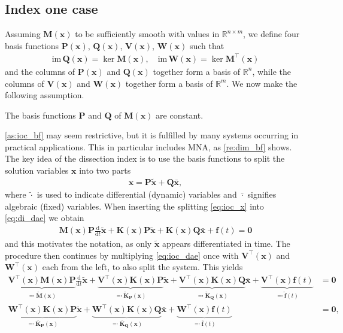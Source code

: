 \documentclass[AMA,STIX1COL]{WileyNJD-v2}
\newcommand{\mb}[1]{\mathbf{#1}}
\newcommand{\mbt}[1]{\tilde{\mathbf{#1}}}
\newcommand{\mbb}[1]{\bar{\mathbf{#1}}}
\newcommand{\mr}[1]{\mathrm{#1}}
\newcommand{\T}{{\!\top}}
\newcommand{\ddt}{\frac{\mathrm{d}}{\mathrm{d}t}}
\begin{document}
\subsection{Index one case}
\label{subsec:ioc}
Assuming $\mb{M}(\mb{x})$ to be sufficiently smooth with values in $\mathbb{R}^{n \times m}$, we define four basis functions $\mb{P}(\mb{x})$, $\mb{Q}(\mb{x})$, $\mb{V}(\mb{x})$, $\mb{W}(\mb{x})$ such that
\begin{align*}
    \mr{im\, } \mb{Q}(\mb{x}) = \ker \mb{M}(\mb{x}), \quad \mr{im\, } \mb{W}(\mb{x}) = \ker \mb{M}^\T (\mb{x})
\end{align*}
and the columns of $\mb{P}(\mb{x})$ and $\mb{Q}(\mb{x})$ together form a basis of $\mathbb{R}^n$, while the columns of $\mb{V}(\mb{x})$ and $\mb{W}(\mb{x})$ together form a basis of $\mathbb{R}^m$. We now make the following assumption.
\begin{assumption}
    \label{as:ioc_bf}
    The basis functions $\mb{P}$ and $\mb{Q}$ of $\mb{M}(\mb{x})$ are constant.
\end{assumption}
\autoref{as:ioc_bf} may seem restrictive, but it is fulfilled by many systems occurring in practical applications\cite{jansen2014}. This in particular includes MNA, as \autoref{re:dim_bf} shows. The key idea of the dissection index is to use the basis functions to split the solution variables $\mb{x}$ into two parts
\begin{align}
    \mb{x} = \mb{P} \mbt{x} + \mb{Q} \mbb{x}, \label{eq:ioc_x}
\end{align}
where $\tilde{\cdot}$ is used to indicate differential (dynamic) variables and $\bar{\cdot}$ signifies algebraic (fixed) variables. When inserting the splitting \eqref{eq:ioc_x} into \eqref{eq:di_dae} we obtain
\begin{align}
    \mb{M}(\mb{x}) \mb{P} \ddt \mbt{x} + \mb{K}(\mb{x}) \mb{P} \mbt{x} + \mb{K}(\mb{x}) \mb{Q} \mbb{x} + \mb{f}(t) = \mb{0} \label{eq:ioc_dae}
\end{align}
and this motivates the notation, as only $\mbt{x}$ appears differentiated in time. The procedure then continues by multiplying \eqref{eq:ioc_dae} once with $\mb{V}^\T (\mb{x})$ and $\mb{W}^\T (\mb{x})$ each from the left, to also split the system. This yields
\begin{subequations}
    \label{eq:ioc_io}
    \begin{align}
            \underbrace{\mb{V}^\T (\mb{x}) \mb{M}(\mb{x}) \mb{P}}_{\eqqcolon \mbt{M}(\mb{x})} \ddt \mbt{x} + \underbrace{\mb{V}^\T (\mb{x}) \mb{K}(\mb{x}) \mb{P}}_{\eqqcolon \mbt{K}_\mb{P}(\mb{x})} \mbt{x} + \underbrace{\mb{V}^\T (\mb{x}) \mb{K}(\mb{x}) \mb{Q}}_{\eqqcolon \mbt{K}_\mb{Q}(\mb{x})} \mbb{x} + \underbrace{\mb{V}^\T (\mb{x}) \mb{f}(t)}_{\eqqcolon \mbt{f}(t)} &= \mb{0} \label{eq:ioc_ioa}\\
            \underbrace{\mb{W}^\T (\mb{x}) \mb{K}(\mb{x}) \mb{P}}_{\eqqcolon \mbb{K}_\mb{P}(\mb{x})} \mbt{x} + \underbrace{\mb{W}^\T (\mb{x}) \mb{K}(\mb{x}) \mb{Q}}_{\eqqcolon \mbb{K}_\mb{Q}(\mb{x})} \mbb{x} + \underbrace{\mb{W}^\T (\mb{x}) \mb{f}(t)}_{\eqqcolon \mbb{f}(t)} &= \mb{0}, \label{eq:ioc_iob}
    \end{align}
\end{subequations}
\end{document}
